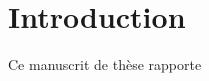 \documentclass[a4paper,11pt,twoside]{StyleThese}
\begin{document}
\fi


\chapter*{Introduction}
Ce manuscrit de thèse rapporte 

\ifdefined{}
\else


\end{document}
